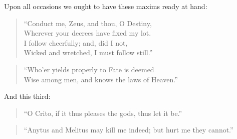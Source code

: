 Upon all occasions we ought to have these maxims ready at hand:

\begin{quote}
  ``Conduct me, Zeus, and thou, O Destiny, \\
  Wherever your decrees have fixed my lot. \\
  I follow cheerfully; and, did I not, \\
  Wicked and wretched, I must follow still.''\footnotemark
\end{quote}

\begin{quote}
  ``Who'er yields properly to Fate is deemed \\
  Wise among men, and knows the laws of Heaven.''\footnotemark
\end{quote}

And this third:

\begin{quote}
  ``O Crito, if it thus pleases the gods, thus let it be.''\footnotemark
\end{quote}

\begin{quote}
  ``Anytus and Melitus may kill me indeed; but hurt me they cannot.''\footnotemark
\end{quote}
